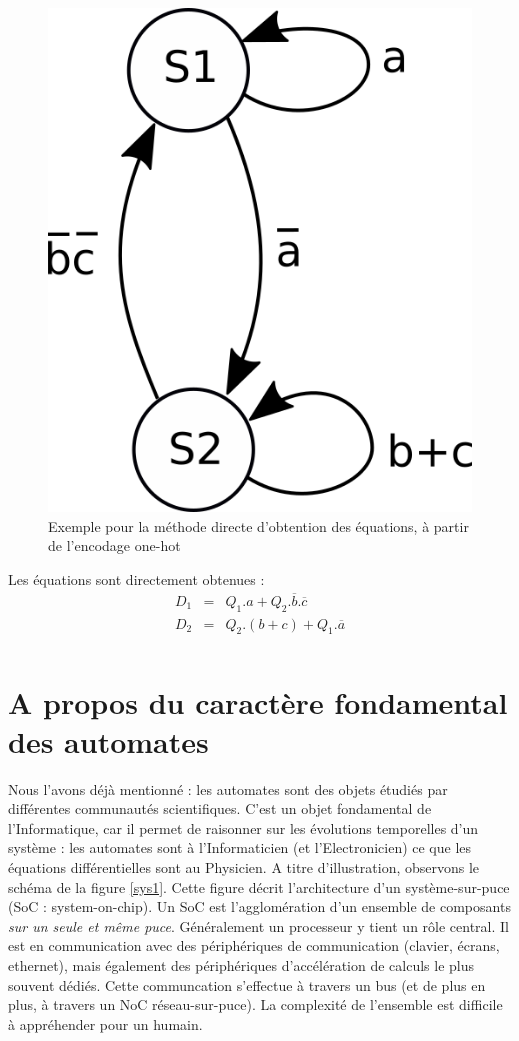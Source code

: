 \begin{figure}[!hbt]
  \centering
  \includegraphics[scale=0.25]{./figures/fsm_one_hot.png}
  \caption{Exemple pour la méthode directe d'obtention des équations, à partir de l'encodage one-hot}
  \label{fig:one_hot2}
\end{figure}

Les équations sont directement obtenues :
$$
\begin{array}{lcl}
  D_1 & = & Q_1.a+Q_2.\overline{b}.\overline{c}\\
  D_2 & = & Q_2.(b+c)+Q_1.\overline{a}\\
\end{array}
$$

\section{A propos du caractère fondamental des automates}

Nous l'avons déjà mentionné : les automates sont des objets étudiés par différentes
communautés scientifiques. C'est un objet fondamental de l'Informatique, car il permet
de raisonner sur les évolutions temporelles d'un système : les automates sont à l'Informaticien (et l'Electronicien)
ce que les équations différentielles sont au Physicien. A titre d'illustration, observons le schéma de la figure \ref{sys1}. Cette figure décrit l'architecture d'un système-sur-puce (SoC : system-on-chip).
Un SoC est l'agglomération d'un ensemble de composants {\it sur un seule et même puce}. Généralement un processeur y tient un rôle central. Il est en communication
avec des périphériques de communication (clavier, écrans, ethernet), mais également des périphériques d'accélération de calculs le plus souvent dédiés. Cette
communcation s'effectue à travers un bus (et de plus en plus, à travers un NoC réseau-sur-puce). La complexité de l'ensemble est difficile à appréhender pour un humain.


